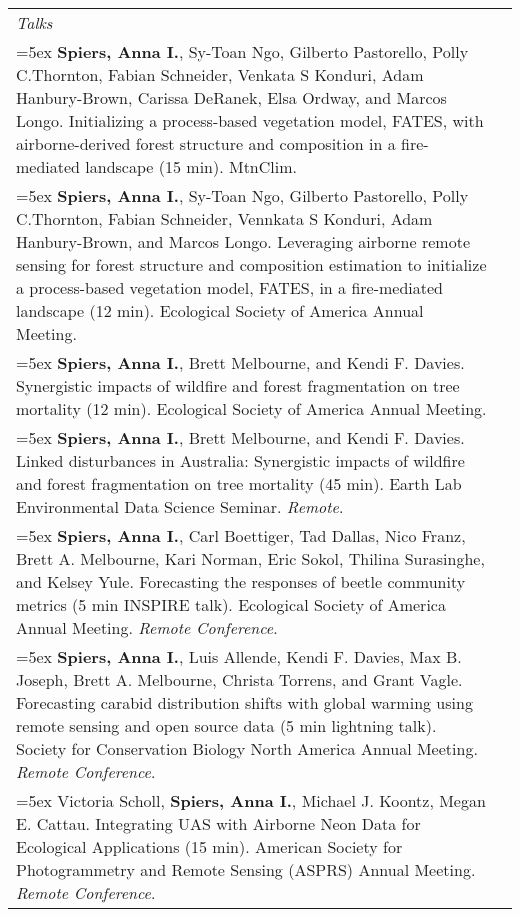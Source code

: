 \begin{longtable}{@{}>{\raggedright}p{5.25in} @{} >{\raggedleft}X@{}}

\emph{Talks}  \tabularnewline

\hangindent=5ex \textbf{Spiers, Anna I.}, Sy-Toan Ngo, Gilberto Pastorello, Polly C.Thornton, Fabian Schneider, Venkata S Konduri, Adam Hanbury-Brown, Carissa DeRanek, Elsa Ordway, and Marcos Longo. Initializing a process-based vegetation model, FATES, with airborne-derived forest structure and composition in a fire-mediated landscape (15 min). MtnClim. & 2024 \tabularnewline %

\hangindent=5ex \textbf{Spiers, Anna I.}, Sy-Toan Ngo, Gilberto Pastorello, Polly C.Thornton, Fabian Schneider, Vennkata S Konduri, Adam Hanbury-Brown, and Marcos Longo. Leveraging airborne remote sensing for forest structure and composition estimation to initialize a process-based vegetation model, FATES, in a fire-mediated landscape (12 min). Ecological Society of America Annual Meeting. & 2024 \tabularnewline %

\hangindent=5ex \textbf{Spiers, Anna I.}, Brett Melbourne, and Kendi F. Davies. Synergistic impacts of wildfire and forest fragmentation on tree mortality (12 min). Ecological Society of America Annual Meeting. & 2023 \tabularnewline %

\hangindent=5ex \textbf{Spiers, Anna I.}, Brett Melbourne, and Kendi F. Davies. Linked disturbances in Australia: Synergistic impacts of wildfire and forest fragmentation on tree mortality (45 min). Earth Lab Environmental Data Science Seminar. \emph{Remote}. & 2022 \tabularnewline %

\hangindent=5ex \textbf{Spiers, Anna I.}, Carl Boettiger, Tad Dallas, Nico Franz, Brett A. Melbourne, Kari Norman, Eric Sokol, Thilina Surasinghe, and Kelsey Yule. Forecasting the responses of beetle community metrics (5 min INSPIRE talk). Ecological Society of America Annual Meeting. \emph{Remote Conference}. & 2021 \tabularnewline %

\hangindent=5ex \textbf{Spiers, Anna I.}, Luis Allende, Kendi F. Davies, Max B. Joseph, Brett A. Melbourne, Christa Torrens, and Grant Vagle. Forecasting carabid distribution shifts with global warming using remote sensing and open source data (5 min lightning talk). Society for Conservation Biology North America Annual Meeting. \emph{Remote Conference}. & 2020 \tabularnewline %

\hangindent=5ex Victoria Scholl, \textbf{Spiers, Anna I.}, Michael J. Koontz, Megan E. Cattau. Integrating UAS with Airborne Neon Data for Ecological Applications (15 min).  American Society for Photogrammetry and Remote Sensing (ASPRS) Annual Meeting. \emph{Remote Conference}. & 2020 \tabularnewline %


\end{longtable}
